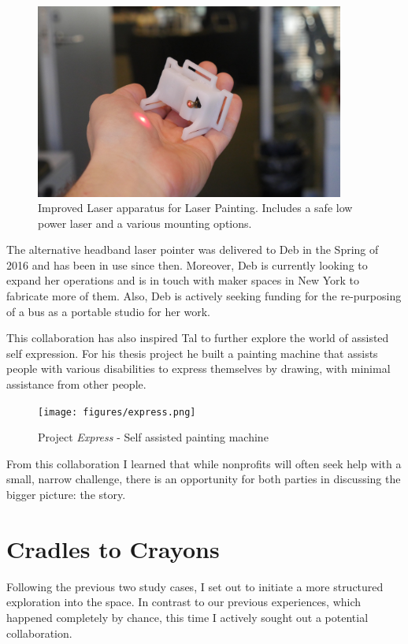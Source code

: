    \begin{figure}[thpb]
      \centering
      \includegraphics[width=4in]{figures/new-laser.jpg}
      \caption{Improved Laser apparatus for Laser Painting. Includes a safe low power laser and a various mounting options.}
      \label{new-laser}
   \end{figure}


The alternative headband laser pointer was delivered to Deb in the Spring of 2016 and has been in use since then. Moreover, Deb is currently looking to expand her operations and is in touch with maker spaces in New York to fabricate more of them. Also, Deb is actively seeking funding for the re-purposing of a bus as a portable studio for her work. 

This collaboration has also inspired Tal to further explore the world of assisted self expression.  For his thesis project he built a painting machine that assists people with various disabilities to express themselves by drawing, with minimal assistance from other people\cite{projexpress}. 

   \begin{figure}[thpb]
      \centering
      \texttt{[image: figures/express.png]}
      \caption{Project \textit{Express} - Self assisted painting machine}
      \label{express}
   \end{figure}

From this collaboration I learned that while nonprofits will often seek help with a small, narrow challenge, there is an opportunity for both parties in discussing the bigger picture: the story. 

\section{Cradles to Crayons}

Following the previous two study cases, I set out to initiate a more structured exploration into the space. In contrast to our previous experiences, which happened completely by chance, this time I actively sought out a potential collaboration. 

